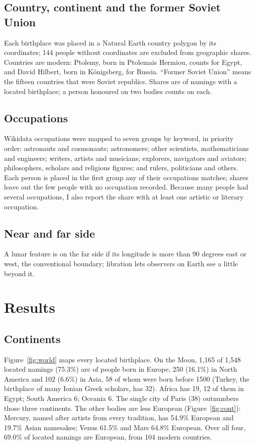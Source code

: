 \documentclass[11pt,a4paper]{article}
\begin{document}
\subsection{Country, continent and the former Soviet Union}
Each birthplace was placed in a Natural Earth country polygon by its coordinates; 144 people without coordinates are excluded from geographic shares. Countries are modern: Ptolemy, born in Ptolemais Hermiou, counts for Egypt, and David Hilbert, born in K\"onigsberg, for Russia. ``Former Soviet Union'' means the fifteen countries that were Soviet republics. Shares are of namings with a located birthplace; a person honoured on two bodies counts on each.

\subsection{Occupations}
Wikidata occupations were mapped to seven groups by keyword, in priority order: astronauts and cosmonauts; astronomers; other scientists, mathematicians and engineers; writers, artists and musicians; explorers, navigators and aviators; philosophers, scholars and religious figures; and rulers, politicians and others. Each person is placed in the first group any of their occupations matches; shares leave out the few people with no occupation recorded. Because many people had several occupations, I also report the share with at least one artistic or literary occupation.

\subsection{Near and far side}
A lunar feature is on the far side if its longitude is more than 90 degrees east or west, the conventional boundary; libration lets observers on Earth see a little beyond it.

\section{Results}
\subsection{Continents}
Figure~\ref{fig:world} maps every located birthplace. On the Moon, 1,165 of 1,548 located namings (75.3\%) are of people born in Europe, 250 (16.1\%) in North America and 102 (6.6\%) in Asia, 58 of whom were born before 1500 (Turkey, the birthplace of many Ionian Greek scholars, has 32). Africa has 19, 12 of them in Egypt; South America 6; Oceania 6. The single city of Paris (38) outnumbers those three continents. The other bodies are less European (Figure~\ref{fig:cont}): Mercury, named after artists from every tradition, has 54.9\% European and 19.7\% Asian namesakes; Venus 61.5\% and Mars 64.8\% European. Over all four, 69.0\% of located namings are European, from 104 modern countries.
\end{document}
